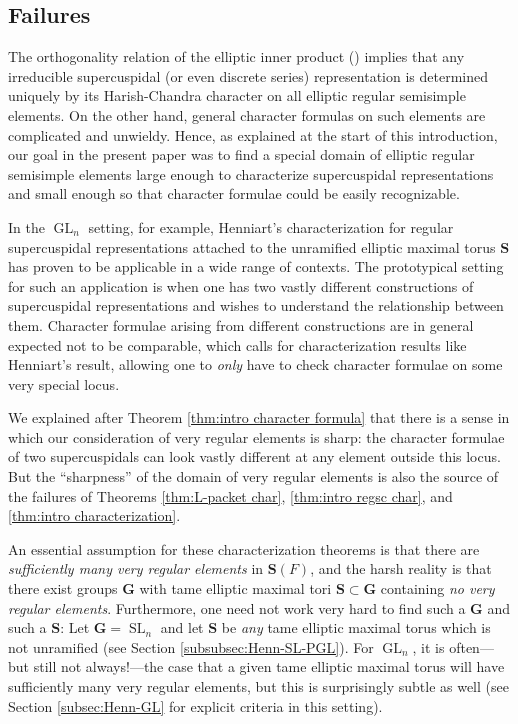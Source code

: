 \documentclass{amsart}
\newcommand{\bfG}{\mathbf{G}}
\newcommand{\bfS}{\mathbf{S}}
\DeclareMathOperator{\GL}{GL}
\DeclareMathOperator{\SL}{SL}
\theoremstyle{plain}
\theoremstyle{definition}
\theoremstyle{remark}
\theoremstyle{theorem}
\begin{document}
\subsection{Failures}\label{subsec:intro failures}

The orthogonality relation of the elliptic inner product (\cite[Theorem 3]{Clo91}) implies that any irreducible supercuspidal (or even discrete series) representation is determined uniquely by its Harish-Chandra character on all elliptic regular semisimple elements. 
On the other hand, general character formulas on such elements are complicated and unwieldy. 
Hence, as explained at the start of this introduction, our goal in the present paper was to find a special domain of elliptic regular semisimple elements large enough to characterize supercuspidal representations and small enough so that character formulae could be easily recognizable.

In the $\GL_n$ setting, for example, Henniart's characterization for regular supercuspidal representations attached to the unramified elliptic maximal torus $\bfS$ has proven to be applicable in a wide range of contexts.
The prototypical setting for such an application is when one has two vastly different constructions of supercuspidal representations and wishes to understand the relationship between them.
Character formulae arising from different constructions are in general expected not to be comparable, which calls for characterization results like Henniart's result, allowing one to \textit{only} have to check character formulae on some very special locus.

We explained after Theorem \ref{thm:intro character formula} that there is a sense in which our consideration of very regular elements is sharp: the character formulae of two supercuspidals can look vastly different at any element outside this locus. But the ``sharpness'' of the domain of very regular elements is also the source of the failures of Theorems \ref{thm:L-packet char}, \ref{thm:intro regsc char}, and \ref{thm:intro characterization}.

An essential assumption for these characterization theorems is that there are \textit{sufficiently many very regular elements} in $\bfS(F)$, and the harsh reality is that there exist groups $\bfG$ with tame elliptic maximal tori $\bfS \subset \bfG$ containing \textit{no very regular elements}.
Furthermore, one need not work very hard to find such a $\bfG$ and such a $\bfS$: Let $\bfG = \SL_n$ and let $\bfS$ be \textit{any} tame elliptic maximal torus which is not unramified (see Section \ref{subsubsec:Henn-SL-PGL}). 
For $\GL_n$, it is often---but still not always!---the case that a given tame elliptic maximal torus will have sufficiently many very regular elements, but this is surprisingly subtle as well (see Section \ref{subsec:Henn-GL} for explicit criteria in this setting). 
\end{document}
